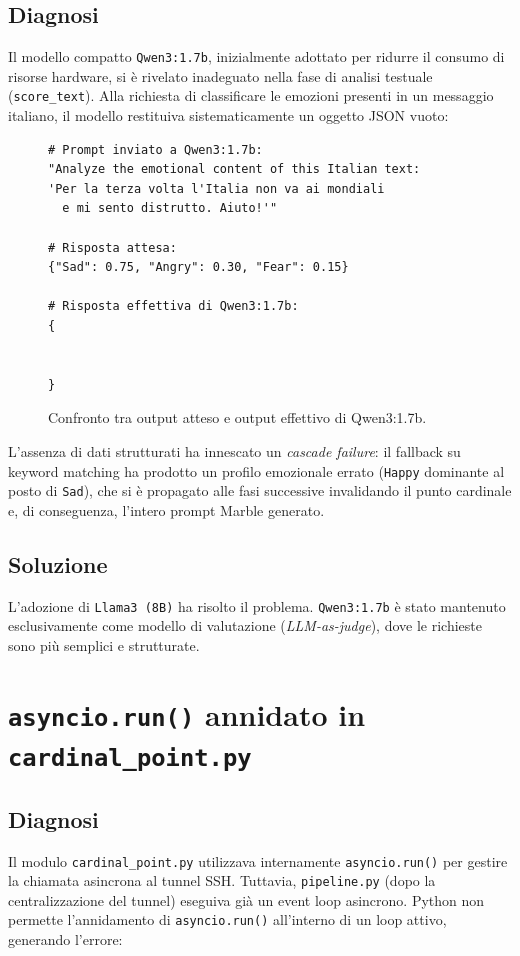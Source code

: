 \documentclass[11pt]{report}
\begin{document}
\subsection*{Diagnosi}
Il modello compatto \texttt{Qwen3:1.7b}, inizialmente adottato per ridurre il consumo di risorse hardware, si è rivelato inadeguato nella fase di analisi testuale (\texttt{score\_text}). Alla richiesta di classificare le emozioni presenti in un messaggio italiano, il modello restituiva sistematicamente un oggetto JSON vuoto:
 
\begin{figure}[H]
\begin{verbatim}
# Prompt inviato a Qwen3:1.7b:
"Analyze the emotional content of this Italian text:
'Per la terza volta l'Italia non va ai mondiali 
  e mi sento distrutto. Aiuto!'"
 
# Risposta attesa:
{"Sad": 0.75, "Angry": 0.30, "Fear": 0.15}
 
# Risposta effettiva di Qwen3:1.7b:
{
 
 
}
\end{verbatim}
\caption{Confronto tra output atteso e output effettivo di Qwen3:1.7b.}
\end{figure}
 
L'assenza di dati strutturati ha innescato un \textit{cascade failure}: il fallback su keyword matching ha prodotto un profilo emozionale errato (\texttt{Happy} dominante al posto di \texttt{Sad}), che si è propagato alle fasi successive invalidando il punto cardinale e, di conseguenza, l'intero prompt Marble generato.
 
\subsection*{Soluzione}
L'adozione di \texttt{Llama3 (8B)} ha risolto il problema. \texttt{Qwen3:1.7b} è stato mantenuto esclusivamente come modello di valutazione (\textit{LLM-as-judge}), dove le richieste sono più semplici e strutturate.
 
 
\section{\texttt{asyncio.run()} annidato in \texttt{cardinal\_point.py}}
 
\subsection*{Diagnosi}
Il modulo \texttt{cardinal\_point.py} utilizzava internamente \texttt{asyncio.run()} per gestire la chiamata asincrona al tunnel SSH. Tuttavia, \texttt{pipeline.py} (dopo la centralizzazione del tunnel) eseguiva già un event loop asincrono. Python non permette l'annidamento di \texttt{asyncio.run()} all'interno di un loop attivo, generando l'errore:
 
\end{document}
